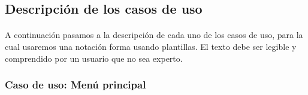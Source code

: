 
\subsection{Descripción de los casos de uso}

\paragraph{}
A continuación pasamos a la descripción de cada uno de los casos de uso, para la cual usaremos una notación forma usando plantillas.
El texto debe ser legible y comprendido por un usuario que no sea experto.

\subsubsection{Caso de uso: Menú principal}

